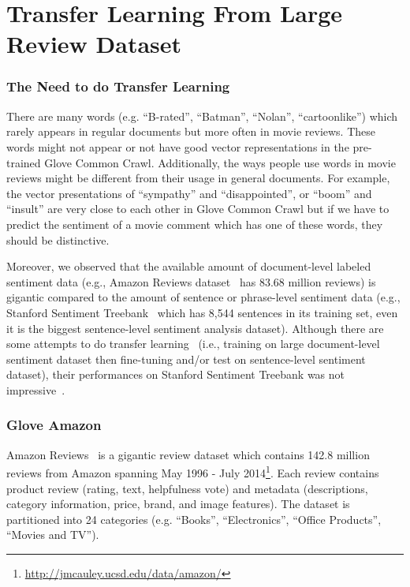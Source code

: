 \section{Transfer Learning From Large Review Dataset}
\subsubsection{The Need to do Transfer Learning}
There are many words (e.g. ``B-rated'', ``Batman'', ``Nolan'', ``cartoonlike'') which rarely appears in regular documents but more often in movie reviews.
These words might not appear or not have good vector representations in the pre-trained Glove Common Crawl.
Additionally, the ways people use words in movie reviews might be different from their usage in general documents.
For example, the vector presentations of ``sympathy'' and ``disappointed'', or ``boom'' and ``insult'' are very close to each other in Glove Common Crawl but if we have to predict the sentiment of a movie comment which has one of these words, they should be distinctive.


Moreover, we observed that the available amount of document-level labeled sentiment data (e.g., Amazon Reviews dataset~\cite{amazon-reviews} has 83.68 million reviews) is gigantic compared to the amount of sentence or phrase-level sentiment data (e.g., Stanford Sentiment Treebank~\cite{socher2013recursive} which has 8,544 sentences in its training set, even it is the biggest sentence-level sentiment analysis dataset).
Although there are some attempts to do transfer learning~\cite{group-instance, re-embedding} (i.e., training on large document-level sentiment dataset then fine-tuning and/or test on sentence-level sentiment dataset), their performances on Stanford Sentiment Treebank was not impressive~\cite{group-instance}.

\subsubsection{Glove Amazon}\label{sec:glove-amazon}
Amazon Reviews~\cite{amazon-reviews} is a gigantic review dataset
which contains 142.8 million reviews from Amazon spanning May 1996 - July 2014\footnote{\url{http://jmcauley.ucsd.edu/data/amazon/}}.
Each review contains product review (rating, text, helpfulness vote) and metadata (descriptions, category information, price, brand, and image features).
The dataset is partitioned into 24 categories (e.g. ``Books'', ``Electronics'', ``Office Products'', ``Movies and TV'').


